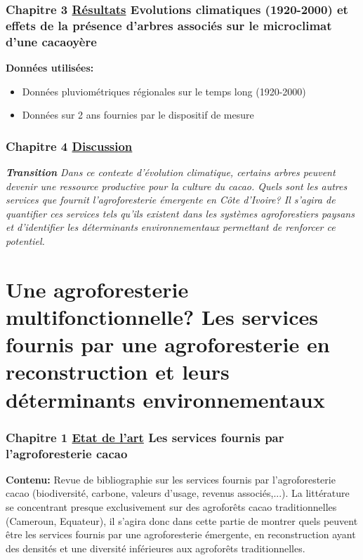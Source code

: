 \documentclass[a4paper,notitlepage]{article}
\begin{document}
\section*{Chapitre 3 \underline{Résultats} Evolutions climatiques (1920-2000) et effets de la présence d'arbres associés sur le microclimat d'une cacaoyère}
\textbf{Données utilisées:}
\begin{itemize} 
\item{Données pluviométriques régionales sur le temps long (1920-2000)}
\item{Données sur 2 ans fournies par le dispositif de mesure}
\end{itemize}

\section*{Chapitre 4 \underline{Discussion}}
\vspace{1cm}

\textit{\textbf{Transition} Dans ce contexte d'évolution climatique, certains arbres peuvent devenir une ressource productive pour la culture du cacao. Quels sont les autres services que fournit l'agroforesterie émergente en Côte d'Ivoire? Il s'agira de quantifier ces services tels qu'ils existent dans les systèmes agroforestiers paysans et d'identifier les déterminants environnementaux permettant de renforcer ce potentiel.} 

\vspace{1cm}



\part{ Une agroforesterie multifonctionnelle?  Les services fournis par une agroforesterie en reconstruction et leurs déterminants environnementaux}
\vspace{1cm}
\setcounter{section}{0}
\section*{Chapitre 1 \underline{Etat de l'art} Les services fournis par l'agroforesterie cacao}
\textbf{Contenu: } Revue de bibliographie sur les services fournis par l'agroforesterie cacao (biodiversité, carbone, valeurs d'usage, revenus associés,...). La littérature se concentrant presque exclusivement sur des agroforêts cacao traditionnelles (Cameroun, Equateur), il s'agira donc dans cette partie de montrer quels peuvent être les services fournis par une agroforesterie émergente, en reconstruction ayant des densités et une diversité inférieures aux agroforêts traditionnelles. 
\end{document}
